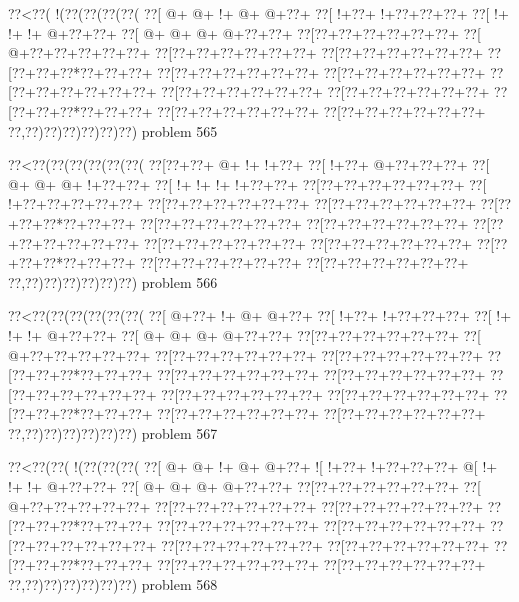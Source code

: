 \vbox{\vbox{\goo
\0??<\0??(\- !(\0??(\0??(\0??(\0??(
\0??[\- @+\- @+\- !+\- @+\- @+\0??+
\0??[\- !+\0??+\- !+\0??+\0??+\0??+
\0??[\- !+\- !+\- !+\- @+\0??+\0??+
\0??[\- @+\- @+\- @+\- @+\0??+\0??+
\0??[\0??+\0??+\0??+\0??+\0??+\0??+
\0??[\- @+\0??+\0??+\0??+\0??+\0??+
\0??[\0??+\0??+\0??+\0??+\0??+\0??+
\0??[\0??+\0??+\0??+\0??+\0??+\0??+
\0??[\0??+\0??+\0??*\0??+\0??+\0??+
\0??[\0??+\0??+\0??+\0??+\0??+\0??+
\0??[\0??+\0??+\0??+\0??+\0??+\0??+
\0??[\0??+\0??+\0??+\0??+\0??+\0??+
\0??[\0??+\0??+\0??+\0??+\0??+\0??+
\0??[\0??+\0??+\0??+\0??+\0??+\0??+
\0??[\0??+\0??+\0??*\0??+\0??+\0??+
\0??[\0??+\0??+\0??+\0??+\0??+\0??+
\0??[\0??+\0??+\0??+\0??+\0??+\0??+
\0??,\0??)\0??)\0??)\0??)\0??)\0??)
}
\hfil problem 565\hfil\break
}

\vbox{\vbox{\goo
\0??<\0??(\0??(\0??(\0??(\0??(\0??(
\0??[\0??+\0??+\- @+\- !+\- !+\0??+
\0??[\- !+\0??+\- @+\0??+\0??+\0??+
\0??[\- @+\- @+\- @+\- !+\0??+\0??+
\0??[\- !+\- !+\- !+\- !+\0??+\0??+
\0??[\0??+\0??+\0??+\0??+\0??+\0??+
\0??[\- !+\0??+\0??+\0??+\0??+\0??+
\0??[\0??+\0??+\0??+\0??+\0??+\0??+
\0??[\0??+\0??+\0??+\0??+\0??+\0??+
\0??[\0??+\0??+\0??*\0??+\0??+\0??+
\0??[\0??+\0??+\0??+\0??+\0??+\0??+
\0??[\0??+\0??+\0??+\0??+\0??+\0??+
\0??[\0??+\0??+\0??+\0??+\0??+\0??+
\0??[\0??+\0??+\0??+\0??+\0??+\0??+
\0??[\0??+\0??+\0??+\0??+\0??+\0??+
\0??[\0??+\0??+\0??*\0??+\0??+\0??+
\0??[\0??+\0??+\0??+\0??+\0??+\0??+
\0??[\0??+\0??+\0??+\0??+\0??+\0??+
\0??,\0??)\0??)\0??)\0??)\0??)\0??)
}
\hfil problem 566\hfil\break
}

\vbox{\vbox{\goo
\0??<\0??(\0??(\0??(\0??(\0??(\0??(
\0??[\- @+\0??+\- !+\- @+\- @+\0??+
\0??[\- !+\0??+\- !+\0??+\0??+\0??+
\0??[\- !+\- !+\- !+\- @+\0??+\0??+
\0??[\- @+\- @+\- @+\- @+\0??+\0??+
\0??[\0??+\0??+\0??+\0??+\0??+\0??+
\0??[\- @+\0??+\0??+\0??+\0??+\0??+
\0??[\0??+\0??+\0??+\0??+\0??+\0??+
\0??[\0??+\0??+\0??+\0??+\0??+\0??+
\0??[\0??+\0??+\0??*\0??+\0??+\0??+
\0??[\0??+\0??+\0??+\0??+\0??+\0??+
\0??[\0??+\0??+\0??+\0??+\0??+\0??+
\0??[\0??+\0??+\0??+\0??+\0??+\0??+
\0??[\0??+\0??+\0??+\0??+\0??+\0??+
\0??[\0??+\0??+\0??+\0??+\0??+\0??+
\0??[\0??+\0??+\0??*\0??+\0??+\0??+
\0??[\0??+\0??+\0??+\0??+\0??+\0??+
\0??[\0??+\0??+\0??+\0??+\0??+\0??+
\0??,\0??)\0??)\0??)\0??)\0??)\0??)
}
\hfil problem 567\hfil\break
}

\vbox{\vbox{\goo
\0??<\0??(\0??(\- !(\0??(\0??(\0??(
\0??[\- @+\- @+\- !+\- @+\- @+\0??+
\- ![\- !+\0??+\- !+\0??+\0??+\0??+
\- @[\- !+\- !+\- !+\- @+\0??+\0??+
\0??[\- @+\- @+\- @+\- @+\0??+\0??+
\0??[\0??+\0??+\0??+\0??+\0??+\0??+
\0??[\- @+\0??+\0??+\0??+\0??+\0??+
\0??[\0??+\0??+\0??+\0??+\0??+\0??+
\0??[\0??+\0??+\0??+\0??+\0??+\0??+
\0??[\0??+\0??+\0??*\0??+\0??+\0??+
\0??[\0??+\0??+\0??+\0??+\0??+\0??+
\0??[\0??+\0??+\0??+\0??+\0??+\0??+
\0??[\0??+\0??+\0??+\0??+\0??+\0??+
\0??[\0??+\0??+\0??+\0??+\0??+\0??+
\0??[\0??+\0??+\0??+\0??+\0??+\0??+
\0??[\0??+\0??+\0??*\0??+\0??+\0??+
\0??[\0??+\0??+\0??+\0??+\0??+\0??+
\0??[\0??+\0??+\0??+\0??+\0??+\0??+
\0??,\0??)\0??)\0??)\0??)\0??)\0??)
}
\hfil problem 568\hfil\break
}

